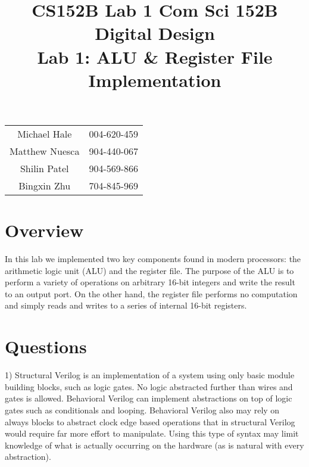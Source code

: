 \documentclass[11pt]{article}
\title{CS152B Lab 1}
\begin{document}
	
\title{\vspace{-0.5in} Com Sci 152B Digital Design \\
	Lab 1: ALU \& Register File Implementation }
\date{}
\maketitle
\vspace{-0.75in}
\begin{center}
\begin{tabular}{cc}
	Michael Hale & 004-620-459 \\ 
	Matthew Nuesca & 904-440-067 \\ 
	Shilin Patel & 904-569-866 \\ 
	Bingxin Zhu & 704-845-969
\end{tabular}
\end{center}

\section*{Overview}

In this lab we implemented two key components found in modern processors: the arithmetic logic unit (ALU) and the register file. The purpose of the ALU is to perform a variety of operations on arbitrary 16-bit integers and write the result to an output port. On the other hand, the register file performs no computation and simply reads and writes to a series of internal 16-bit registers. 


\section*{Questions}
1) Structural Verilog is an implementation of a system using only basic module building blocks, such as logic gates. No logic abstracted further than wires and gates is allowed. Behavioral Verilog can implement abstractions on top of logic gates such as conditionals and looping. Behavioral Verilog also may rely on always blocks to abstract clock edge based operations that in structural Verilog would require far more effort to manipulate. Using this type of syntax may limit knowledge of what is actually occurring on the hardware (as is natural with every abstraction).
\end{document}
